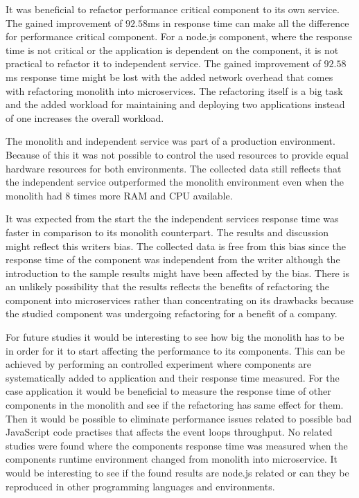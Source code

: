 It was beneficial to refactor performance critical component to its own service. 
The gained improvement of $92.58$ms in response time can make all the difference for performance critical component.
For a node.js component, where the response time is not critical or the application is dependent on the component, it is not practical to refactor it to independent service.
The gained improvement of $92.58$ms response time might be lost with the added network overhead that comes with refactoring monolith into microservices.
The refactoring itself is a big task and the added workload for maintaining and deploying two applications instead of one increases the overall workload.

The monolith and independent service was part of a production environment.
Because of this it was not possible to control the used resources to provide equal hardware resources for both environments.
The collected data still reflects that the independent service outperformed the monolith environment even when the monolith had $8$ times more RAM and CPU available.

It was expected from the start the the independent services response time was faster in comparison to its monolith counterpart.
The results and discussion might reflect this writers bias.
The collected data is free from this bias since the response time of the component was independent from the writer although the introduction to the sample results might have been affected by the bias.
There is an unlikely possibility that the results reflects the benefits of refactoring the component into microservices rather than concentrating on its drawbacks because the studied component was undergoing refactoring for a benefit of a company.

For future studies it would be interesting to see how big the monolith has to be in order for it to start affecting the performance to its components.
This can be achieved by performing an controlled experiment where components are systematically added to application and their response time measured.
For the case application it would be beneficial to measure the response time of other components in the monolith and see if the refactoring has same effect for them.
Then it would be possible to eliminate  performance issues related to possible bad JavaScript code practises that affects the event loops throughput.
No related studies were found where the components response time was measured when the components runtime environment changed from monolith into microservice.
It would be interesting to see if the found results are node.js related or can they be reproduced in other programming languages and environments.
